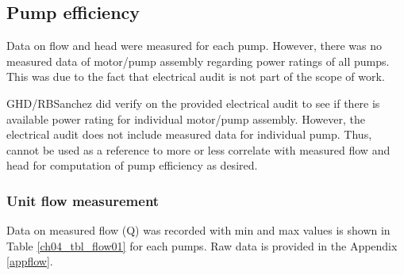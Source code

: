 %
%
%
%


\subsection{Pump efficiency} \label{ch04mech03}
Data on flow and head were measured for each pump. However, there was no measured data of motor/pump assembly regarding power ratings of all pumps. This was due to the fact that electrical audit is not part of the scope of work.

GHD/RBSanchez did verify on the provided electrical audit to see if there is available power rating for individual motor/pump assembly. However, the electrical audit does not include measured data for individual pump. Thus, cannot be used as a reference to more or less correlate with measured flow and head for computation of pump efficiency as desired.

\subsubsection{Unit flow measurement} \label{ch04mech04}
Data on measured flow (Q) was recorded with min and max values is shown in Table \ref{ch04_tbl_flow01} for each pumps. Raw data is provided in the Appendix \ref{appflow}.

